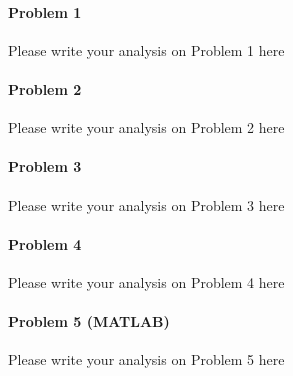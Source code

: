 \documentclass[12pt]{report}
\begin{document}
\maketitle

\paragraph{Problem 1}
Please write your analysis on Problem 1 here


\paragraph{Problem 2}
Please write your analysis on Problem 2 here



\paragraph{Problem 3}
Please write your analysis on Problem 3 here


\paragraph{Problem 4}
Please write your analysis on Problem 4 here



\paragraph{Problem 5 (MATLAB)}
Please write your analysis on Problem 5 here
\end{document}
